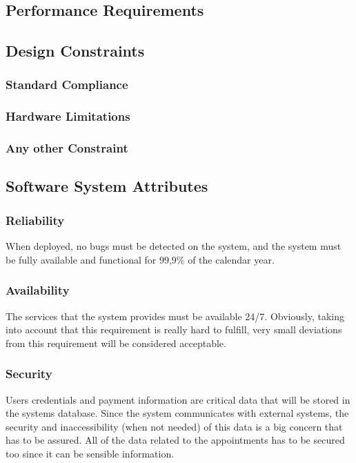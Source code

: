 \documentclass[12pt]{article}
\begin{document}
\subsection{Performance Requirements}

\subsection{Design Constraints}
\subsubsection{Standard Compliance}
\subsubsection{Hardware Limitations}
\subsubsection{Any other Constraint}

\subsection{Software System Attributes}
\subsubsection{Reliability}
When deployed, no bugs must be detected on the system, and the system must be fully available and functional for 99,9\% of the calendar year. 


\subsubsection{Availability}
The services that the system provides must be available 24/7. Obviously, taking into account that this requirement is really hard to fulfill, very small deviations from this requirement will be considered acceptable.

\subsubsection{Security}
Users credentials and payment information are critical data that will be stored in the systems database. Since the system communicates with external systems, the security and inaccessibility (when not needed) of this data is a big concern that has to be assured. All of the data related to the appointments has to be secured too since it can be sensible information. 
\end{document}
